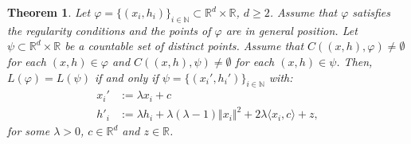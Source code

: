 \documentclass{article}
\newcommand{\NN}{\mathbb{N}}
\newcommand{\RR}{\mathbb{R}}
\theoremstyle{plain}
\newtheorem{theorem}{Theorem}
\theoremstyle{remark}
\theoremstyle{definition}
\begin{document}
\begin{theorem}\label{overparameterization_laguerre_hard}
    Let $\varphi = \{(x_i,h_i)\}_{i \in \NN} \subset \RR^d \times \RR$, $d \geq 2$. Assume that $\varphi$ satisfies the regularity conditions and the points of $\varphi$ are in general position. Let $\psi \subset \RR^d \times \RR$ be a countable set of distinct points. Assume that $C((x,h),\varphi) \neq \emptyset$ for each $(x,h) \in \varphi$ and $C((x,h),\psi) \neq \emptyset$ for each $(x,h) \in \psi$. Then, $L(\varphi) = L(\psi)$ if and only if $\psi = \{(x_i', h_i')\}_{i \in \NN}$ with:
    \begin{align*}
    x_i' &:= \lambda x_i + c\\
    h'_i &:= \lambda h_i + \lambda(\lambda - 1)\Vert x_i \Vert^2 + 2\lambda \langle x_i, c\rangle + z,
\end{align*}
for some $\lambda > 0$, $c \in \RR^d$ and $z \in \RR$.
\end{theorem}
\end{document}

